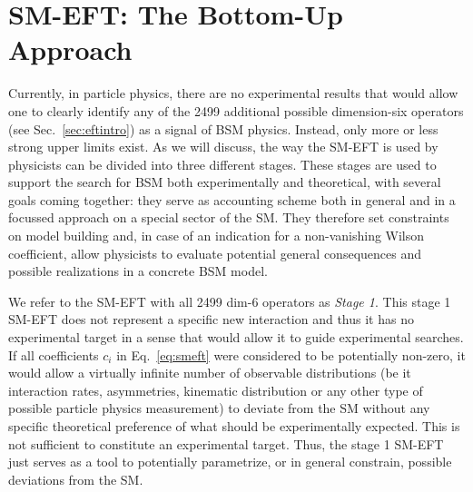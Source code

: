 
\section{SM-EFT: The Bottom-Up Approach}
\label{sec:classification}

Currently, in particle physics, there are no experimental
results that would allow one to clearly identify any of the 2499 additional possible
dimension-six operators
(see Sec.~\ref{sec:eftintro}) as a signal of BSM physics. 
Instead, only more or less strong upper limits exist.
As we will discuss, the way the SM-EFT is used by physicists can be divided into three different stages.
These stages are used to support the search for BSM both experimentally and theoretical,
with several goals coming together: they serve as accounting scheme both in general and in a
focussed approach on a special sector of the SM. 
They therefore set constraints on model building and, in case of an indication for a non-vanishing
Wilson coefficient, allow physicists to evaluate potential general consequences and possible 
realizations in a concrete BSM model.

We refer to the SM-EFT with all 2499 dim-6 operators as \emph{Stage 1}.
This stage 1 SM-EFT does not represent a specific new interaction
and thus it has no experimental target in a sense that would allow it to
guide experimental searches.  
If all coefficients $c_i$ in Eq.~\ref{eq:smeft}
were considered to be potentially non-zero, it would allow a virtually infinite number 
of observable distributions (be it interaction rates, asymmetries, kinematic
distribution or any other type of possible particle physics measurement) 
to deviate from the SM without
any specific theoretical preference of what should be experimentally
expected.
This is not sufficient to constitute an experimental target. 
Thus, the stage 1 SM-EFT just serves as a tool to potentially parametrize, or in general
constrain, possible deviations from the SM. 

